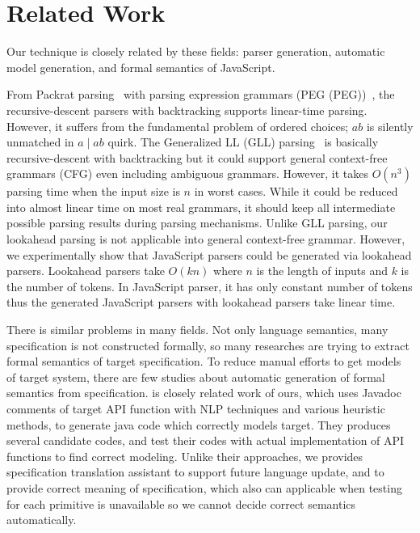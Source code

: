 \section{Related Work}\label{sec:related}

Our technique is closely related by these fields: parser generation, automatic model generation, and formal semantics of JavaScript.

From Packrat parsing~\cite{packrat} with parsing expression grammars (PEG (PEG))~\cite{peg},
the recursive-descent parsers with backtracking supports linear-time parsing.
However, it suffers from the fundamental problem of ordered choices;
\( ab \) is silently unmatched in \( a \mid ab \) quirk.
The Generalized LL (GLL) parsing~\cite{gll} is basically recursive-descent with backtracking
but it could support general context-free grammars (CFG) even including ambiguous grammars.
However, it takes \( O(n^3) \) parsing time when the input size is \( n \) in worst cases.
While it could be reduced into almost linear time on most real grammars,
it should keep all intermediate possible parsing results during parsing mechanisms.
Unlike GLL parsing, our lookahead parsing is not applicable into general context-free grammar.
However, we experimentally show that JavaScript parsers could be generated via lookahead parsers.
Lookahead parsers take \( O(kn) \) where \( n \) is the length of inputs and \( k \)
is the number of tokens. In JavaScript parser, it has only constant number of tokens
thus the generated JavaScript parsers with lookahead parsers take linear time.

There is similar problems in many fields. Not only language semantics, many specification is not constructed formally, so many researches are trying to
extract formal semantics of target specification. To reduce manual efforts to get models of target system, there are few studies about automatic generation of
formal semantics from specification. \cite{javadoc} is closely related work of ours, which uses Javadoc comments of target API function with NLP techniques and various
heuristic methods, to generate java code which correctly models target. They produces several candidate codes, and test their codes with actual implementation of API functions
to find correct modeling. Unlike their approaches, we provides specification translation assistant to support future language update, and to provide correct meaning of specification, which also can applicable when
testing for each primitive is unavailable so we cannot decide correct semantics automatically.

